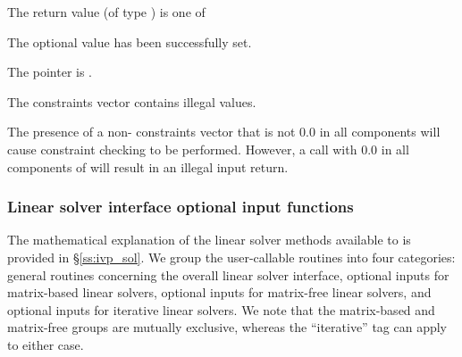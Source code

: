 {{\begin{args}
\begin{itemize}
    \end{itemize}
  \end{args}
}
{
  The return value  (of type ) is one of
  \begin{args}
  \item[\Id{IDA\_SUCCESS}]
    The optional value has been successfully set.
  \item[\Id{IDA\_MEM\_NULL}]
    The  pointer is .
  \item[\Id{IDA\_ILL\_INPUT}]
    The constraints vector contains illegal values.
  \end{args}
}
{
  The presence of a non- constraints vector that is not $0.0$ in
  all components will cause constraint checking to be performed.
  However, a call with $0.0$ in all components of  will
  result in an illegal input return.
}

\subsubsection{Linear solver interface optional input functions}
\label{sss:optin_ls}

The mathematical explanation of the linear solver methods
available to {\ida} is provided in \S\ref{ss:ivp_sol}.  We
group the user-callable routines into four categories: general
routines concerning the overall {\idals} linear solver interface,
optional inputs for matrix-based linear solvers, optional inputs for
matrix-free linear solvers, and optional inputs for iterative linear
solvers.  We note that the matrix-based and matrix-free groups are
mutually exclusive, whereas the ``iterative'' tag can apply to either
case. \\


}
